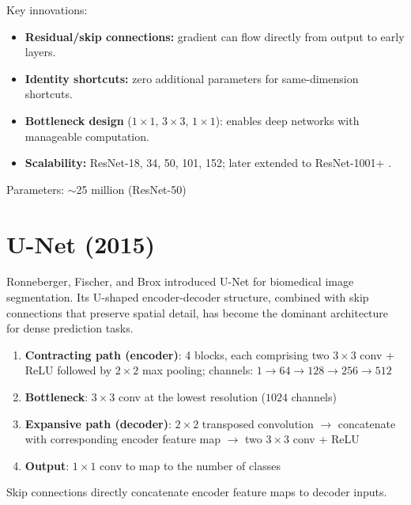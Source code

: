 Key innovations:
\begin{itemize}
    \item \textbf{Residual/skip connections:} gradient can flow directly from output to early layers.
    \item \textbf{Identity shortcuts:} zero additional parameters for same-dimension shortcuts.
    \item \textbf{Bottleneck design} ($1\times1$, $3\times3$, $1\times1$): enables deep networks with manageable computation.
    \item \textbf{Scalability:} ResNet-18, 34, 50, 101, 152; later extended to ResNet-1001+ \cite{he2016identity}.
\end{itemize}

Parameters: $\sim$25 million (ResNet-50)

\section{U-Net (2015)}

Ronneberger, Fischer, and Brox \cite{ronneberger2015u} introduced U-Net for biomedical image segmentation. Its U-shaped encoder-decoder structure, combined with skip connections that preserve spatial detail, has become the dominant architecture for dense prediction tasks.

\begin{architecture}
\begin{enumerate}
    \item \textbf{Contracting path (encoder)}: 4 blocks, each comprising two $3\times3$ conv + ReLU followed by $2\times2$ max pooling; channels: $1 \rightarrow 64 \rightarrow 128 \rightarrow 256 \rightarrow 512$
    \item \textbf{Bottleneck}: $3\times3$ conv at the lowest resolution ($1024$ channels)
    \item \textbf{Expansive path (decoder)}: $2\times2$ transposed convolution $\rightarrow$ concatenate with corresponding encoder feature map $\rightarrow$ two $3\times3$ conv + ReLU
    \item \textbf{Output}: $1\times1$ conv to map to the number of classes
\end{enumerate}
Skip connections directly concatenate encoder feature maps to decoder inputs.
\end{architecture}

